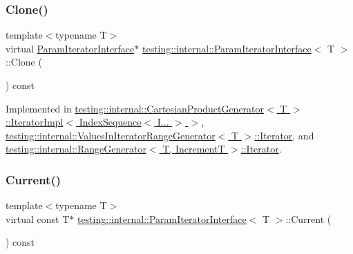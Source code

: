 \subsubsection{\texorpdfstring{Clone()}{Clone()}}
{\footnotesize\ttfamily template$<$typename T$>$ \\
virtual \hyperlink{classtesting_1_1internal_1_1ParamIteratorInterface}{Param\+Iterator\+Interface}$\ast$ \hyperlink{classtesting_1_1internal_1_1ParamIteratorInterface}{testing\+::internal\+::\+Param\+Iterator\+Interface}$<$ T $>$\+::Clone (\begin{DoxyParamCaption}{ }\end{DoxyParamCaption}) const\hspace{0.3cm}{\ttfamily [pure virtual]}}



Implemented in \hyperlink{classtesting_1_1internal_1_1CartesianProductGenerator_1_1IteratorImpl_3_01IndexSequence_3_01I_8_8_8_01_4_01_4_a0b434e09b32dfd6b444085cf95dc22ab}{testing\+::internal\+::\+Cartesian\+Product\+Generator$<$ T $>$\+::\+Iterator\+Impl$<$ Index\+Sequence$<$ I... $>$ $>$}, \hyperlink{classtesting_1_1internal_1_1ValuesInIteratorRangeGenerator_1_1Iterator_a2c5ccf4da12cfb089829438d679ae35e}{testing\+::internal\+::\+Values\+In\+Iterator\+Range\+Generator$<$ T $>$\+::\+Iterator}, and \hyperlink{classtesting_1_1internal_1_1RangeGenerator_1_1Iterator_a61a764294b66272d730f5ff5e0acdcf4}{testing\+::internal\+::\+Range\+Generator$<$ T, Increment\+T $>$\+::\+Iterator}.

\mbox{\label{classtesting_1_1internal_1_1ParamIteratorInterface_adfff808576d929085679c315b255af7e}} 
\subsubsection{\texorpdfstring{Current()}{Current()}}
{\footnotesize\ttfamily template$<$typename T$>$ \\
virtual const T$\ast$ \hyperlink{classtesting_1_1internal_1_1ParamIteratorInterface}{testing\+::internal\+::\+Param\+Iterator\+Interface}$<$ T $>$\+::Current (\begin{DoxyParamCaption}{ }\end{DoxyParamCaption}) const\hspace{0.3cm}{\ttfamily [pure virtual]}}



